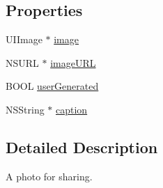 \subsection*{Properties}
\begin{DoxyCompactItemize}
\item 
U\-I\-Image $\ast$ \hyperlink{interface_f_b_s_d_k_share_photo_a93f461424066ad2f65b58902d95d5470}{image}
\item 
N\-S\-U\-R\-L $\ast$ \hyperlink{interface_f_b_s_d_k_share_photo_a499fdf232b43b9222e9db5f320bda63d}{image\-U\-R\-L}
\item 
B\-O\-O\-L \hyperlink{interface_f_b_s_d_k_share_photo_aaa348d2490f0f01361054cf06af7fc4a}{user\-Generated}
\item 
N\-S\-String $\ast$ \hyperlink{interface_f_b_s_d_k_share_photo_a378bd927653780e0ad52400dd095c333}{caption}
\end{DoxyCompactItemize}


\subsection{Detailed Description}
A photo for sharing. 

